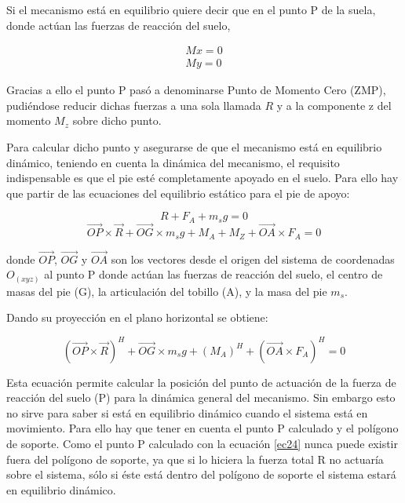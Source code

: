 Si el mecanismo está en equilibrio quiere decir que en el punto P de la suela, donde actúan las fuerzas de reacción del suelo,

\begin{equation}
\begin{split}
Mx=0\\
My=0
\end{split}
\label{ec21}
\end{equation}

Gracias a ello el punto P pasó a denominarse Punto de Momento Cero (ZMP), pudiéndose reducir dichas fuerzas a una sola llamada $R$ y a la componente z del momento $M_z$ sobre dicho punto.

Para calcular dicho punto y asegurarse de que el mecanismo está en equilibrio dinámico, teniendo en cuenta la dinámica del mecanismo, el requisito indispensable es que el pie esté completamente apoyado en el suelo. Para ello hay que partir de las ecuaciones del equilibrio estático para el pie de apoyo:

\begin{equation}
R+F_A+m_sg=0
\label{ec22}
\end{equation}
\begin{equation}
\overrightarrow{OP} \times \overrightarrow{R}+\overrightarrow{OG} \times m_sg + M_A+M_Z+\overrightarrow{OA} \times F_A=0
\label{ec23}
\end{equation}

donde $\overrightarrow{OP}$, $\overrightarrow{OG}$ y $\overrightarrow{OA}$ son los vectores desde el origen del sistema de coordenadas $O_(xyz)$ al punto P donde actúan las fuerzas de reacción del suelo, el centro de masas del pie (G), la articulación del tobillo (A), y la masa del pie $m_s$.

Dando su proyección en el plano horizontal se obtiene:

\begin{equation}
(\overrightarrow{OP} \times \overrightarrow{R})^H+\overrightarrow{OG} \times m_sg+ (M_A)^H+(\overrightarrow{OA} \times F_A)^H=0 
\label{ec24}
\end{equation}

Esta ecuación permite calcular la posición del punto de actuación de la fuerza de reacción del suelo (P) para la dinámica general del mecanismo. Sin embargo esto no sirve para saber si está en equilibrio dinámico cuando el sistema está en movimiento. Para ello hay que tener en cuenta el punto P calculado y el polígono de soporte. Como el punto P calculado con la ecuación \eqref{ec24} nunca puede existir fuera del polígono de soporte, ya que si lo hiciera la fuerza total R no actuaría sobre el sistema, sólo si éste está dentro del polígono de soporte el sistema estará en equilibrio dinámico.


